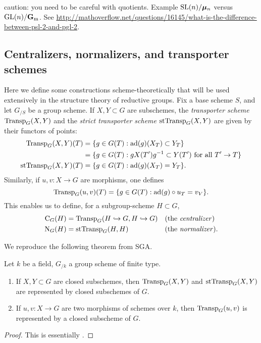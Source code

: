 caution: you need to be careful with quotients. Example $\operatorname{SL}(n)/\bm{\mu}_n$ 
versus $\operatorname{GL}(n)/\mathbf{G}_\mathrm{m}$. See 
\url{http://mathoverflow.net/questions/16145/what-is-the-difference-between-psl-2-and-pgl-2}. 





\subsection{Centralizers, normalizers, and transporter schemes}

Here we define some constructions scheme-theoretically that will be used 
extensively in the structure theory of reductive groups. Fix a base scheme 
$S$, and let $G_{/S}$ be a group scheme. If $X,Y\subset G$ are subschemes, 
the \emph{transporter scheme} $\operatorname{Transp}_G(X,Y)$ and the \emph{strict 
transporter scheme} $\operatorname{stTransp}_G(X,Y)$ are given by their functors 
of points:
\begin{align*}
  \operatorname{Transp}_G(X,Y)(T) 
    &= \{g\in G(T): \operatorname{ad}(g)(X_T)\subset Y_T\} \\
    &= \{g\in G(T):g X(T') g^{-1}\subset Y(T')\text{ for all }T'\to T\} \\
  \operatorname{stTransp}_G(X,Y)(T) 
    &= \{g\in G(T):\operatorname{ad}(g)(X_T)=Y_T\} .
\end{align*}
Similarly, if $u,v:X\to G$ are morphisms, one defines 
\[
  \operatorname{Transp}_G(u,v)(T) = \{g\in G(T):\operatorname{ad}(g)\circ u_T=v_V\} .
\]
This enables us to define, for a subgroup-scheme $H\subset G$, 
\begin{align*}
  \operatorname{C}_G(H) &= \operatorname{Transp}_G(H\hookrightarrow G,H\hookrightarrow G) && \text{(the \emph{centralizer})}\\
  \operatorname{N}_G(H) &= \operatorname{stTransp}_G(H,H) && \text{(the \emph{normalizer})}.
\end{align*}

We reproduce the following theorem from SGA. 

\begin{theorem}
Let $k$ be a field, $G_{/k}$ a group scheme of finite type. 
\begin{enumerate}
\item If $X,Y\subset G$ are closed subschemes, then $\operatorname{Transp}_G(X,Y)$ and 
$\operatorname{stTransp}_G(X,Y)$ are represented by closed subschemes of $G$. 

\item If $u,v:X\to G$ are two morphisms of schemes over $k$, then 
$\operatorname{Transp}_G(u,v)$ is represented by a closed subscheme of $G$. 
\end{enumerate}
\end{theorem}
\begin{proof}
This is essentially \cite[VI\textsubscript{B} 6.2.5]{sga3-i}. 
\end{proof}


